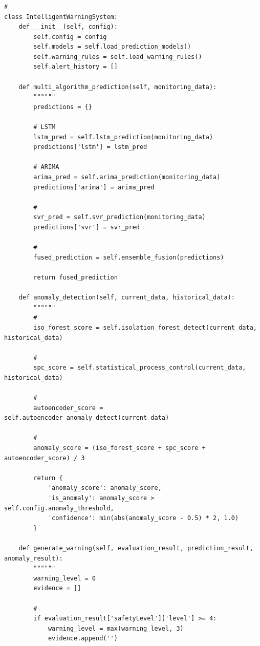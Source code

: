 \subsubsection{}\label{section-53}

\begin{verbatim}
# 
class IntelligentWarningSystem:
    def __init__(self, config):
        self.config = config
        self.models = self.load_prediction_models()
        self.warning_rules = self.load_warning_rules()
        self.alert_history = []
        
    def multi_algorithm_prediction(self, monitoring_data):
        """"""
        predictions = {}
        
        # LSTM
        lstm_pred = self.lstm_prediction(monitoring_data)
        predictions['lstm'] = lstm_pred
        
        # ARIMA
        arima_pred = self.arima_prediction(monitoring_data)
        predictions['arima'] = arima_pred
        
        # 
        svr_pred = self.svr_prediction(monitoring_data)
        predictions['svr'] = svr_pred
        
        # 
        fused_prediction = self.ensemble_fusion(predictions)
        
        return fused_prediction
    
    def anomaly_detection(self, current_data, historical_data):
        """"""
        # 
        iso_forest_score = self.isolation_forest_detect(current_data, historical_data)
        
        #   
        spc_score = self.statistical_process_control(current_data, historical_data)
        
        # 
        autoencoder_score = self.autoencoder_anomaly_detect(current_data)
        
        # 
        anomaly_score = (iso_forest_score + spc_score + autoencoder_score) / 3
        
        return {
            'anomaly_score': anomaly_score,
            'is_anomaly': anomaly_score > self.config.anomaly_threshold,
            'confidence': min(abs(anomaly_score - 0.5) * 2, 1.0)
        }
    
    def generate_warning(self, evaluation_result, prediction_result, anomaly_result):
        """"""
        warning_level = 0
        evidence = []
        
        # 
        if evaluation_result['safetyLevel']['level'] >= 4:
            warning_level = max(warning_level, 3)
            evidence.append('')
            

\end{verbatim}
